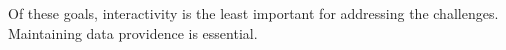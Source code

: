     Of these goals, interactivity is the least important for addressing
      the challenges.
    Maintaining data providence is essential.

